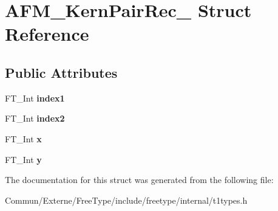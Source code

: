 \hypertarget{struct_a_f_m___kern_pair_rec__}{}\section{A\+F\+M\+\_\+\+Kern\+Pair\+Rec\+\_\+ Struct Reference}
\label{struct_a_f_m___kern_pair_rec__}
\subsection*{Public Attributes}
\begin{DoxyCompactItemize}
\item 
F\+T\+\_\+\+Int {\bfseries index1}\hypertarget{struct_a_f_m___kern_pair_rec___a732bca56dd4a070b1d887ada1637e810}{}\label{struct_a_f_m___kern_pair_rec___a732bca56dd4a070b1d887ada1637e810}

\item 
F\+T\+\_\+\+Int {\bfseries index2}\hypertarget{struct_a_f_m___kern_pair_rec___aee548123779323c255180112c7f5b831}{}\label{struct_a_f_m___kern_pair_rec___aee548123779323c255180112c7f5b831}

\item 
F\+T\+\_\+\+Int {\bfseries x}\hypertarget{struct_a_f_m___kern_pair_rec___a4b7f90a0e17ed89353fec14ddb29fa12}{}\label{struct_a_f_m___kern_pair_rec___a4b7f90a0e17ed89353fec14ddb29fa12}

\item 
F\+T\+\_\+\+Int {\bfseries y}\hypertarget{struct_a_f_m___kern_pair_rec___aa177aa612e79701261eba72c76ea3f08}{}\label{struct_a_f_m___kern_pair_rec___aa177aa612e79701261eba72c76ea3f08}

\end{DoxyCompactItemize}


The documentation for this struct was generated from the following file\+:\begin{DoxyCompactItemize}
\item 
Commun/\+Externe/\+Free\+Type/include/freetype/internal/t1types.\+h\end{DoxyCompactItemize}
